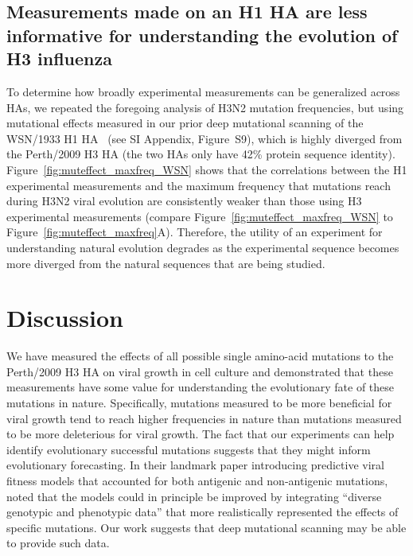 \subsection{Measurements made on an H1 HA are less informative for understanding the evolution of H3 influenza}
To determine how broadly experimental measurements can be generalized across HAs, we repeated the foregoing analysis of H3N2 mutation frequencies, but using mutational effects measured in our prior deep mutational scanning of the WSN/1933 H1 HA~\citep{Doud:2016gm} (see \citet{Lee2018} SI Appendix, Figure~S9), which is highly diverged from the Perth/2009 H3 HA (the two HAs only have 42\% protein sequence identity).
Figure~\ref{fig:muteffect_maxfreq_WSN} shows that the correlations between the H1 experimental measurements and the maximum frequency that mutations reach during H3N2 viral evolution are consistently weaker than those using H3 experimental measurements (compare Figure~\ref{fig:muteffect_maxfreq_WSN} to Figure~\ref{fig:muteffect_maxfreq}A).
Therefore, the utility of an experiment for understanding natural evolution degrades as the experimental sequence becomes more diverged from the natural sequences that are being studied.

\section{Discussion}
\label{sec:discussion}

We have measured the effects of all possible single amino-acid mutations to the Perth/2009 H3 HA on viral growth in cell culture and demonstrated that these measurements have some value for understanding the evolutionary fate of these mutations in nature.
Specifically, mutations measured to be more beneficial for viral growth tend to reach higher frequencies in nature than mutations measured to be more deleterious for viral growth.
The fact that our experiments can help identify evolutionary successful mutations suggests that they might inform evolutionary forecasting.
In their landmark paper introducing predictive viral fitness models that accounted for both antigenic and non-antigenic mutations, \citet{Luksza:2014hj} noted that the models could in principle be improved by integrating ``diverse genotypic and phenotypic data'' that more realistically represented the effects of specific mutations.
Our work suggests that deep mutational scanning may be able to provide such data.

